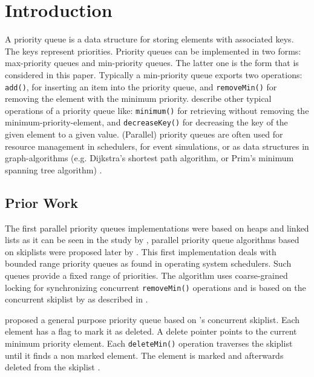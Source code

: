 
\section{Introduction}


A priority queue is a data structure for storing elements with associated keys. The keys represent priorities. Priority queues can be implemented in two forms: max-priority queues and min-priority queues. The latter one is the form that is considered in this paper.
Typically a min-priority queue exports two operations: \texttt{add()}, for inserting an item into the priority queue, and \texttt{removeMin()} for removing the element with the minimum priority. \citeauthor{cormen_introduction_2009} describe other typical operations of a priority queue like: \texttt{minimum()} for retrieving without removing the minimum-priority-element, and \texttt{decreaseKey()} for decreasing the key of the given element to a given value.
(Parallel) priority queues are often used for resource management in schedulers, for event simulations, or as data structures in graph-algorithms (e.g. Dijkstra's shortest path algorithm, or Prim's minimum spanning tree algorithm) \cite{cormen_introduction_2009}.

\subsection{Prior Work}

The first parallel priority queues implementations were based on heaps and linked lists as it can be seen in the study by \citeauthor{ronngren_comparative_1997} \cite{ronngren_comparative_1997}, parallel priority queue algorithms based on skiplists were proposed later by \citeauthor{shavit_scalable_1999}. This first implementation deals with bounded range priority queues as found in operating system schedulers. Such queues provide a fixed range of priorities. The algorithm uses coarse-grained locking for synchronizing concurrent \texttt{removeMin()} operations and is based on the concurrent skiplist by \citeauthor{pugh_concurrent_1990} as described in \cite{pugh_concurrent_1990} \cite{shavit_scalable_1999}.

\citeauthor{lotan_skiplist-based_2000} proposed a general purpose priority queue based on \citeauthor{pugh_concurrent_1990}'s concurrent skiplist. Each element has a flag to mark it as deleted. A delete pointer points to the current minimum priority element. Each \texttt{deleteMin()} operation traverses the skiplist until it finds a non marked element. The element is marked and afterwards deleted from the skiplist \cite{lotan_skiplist-based_2000}.


